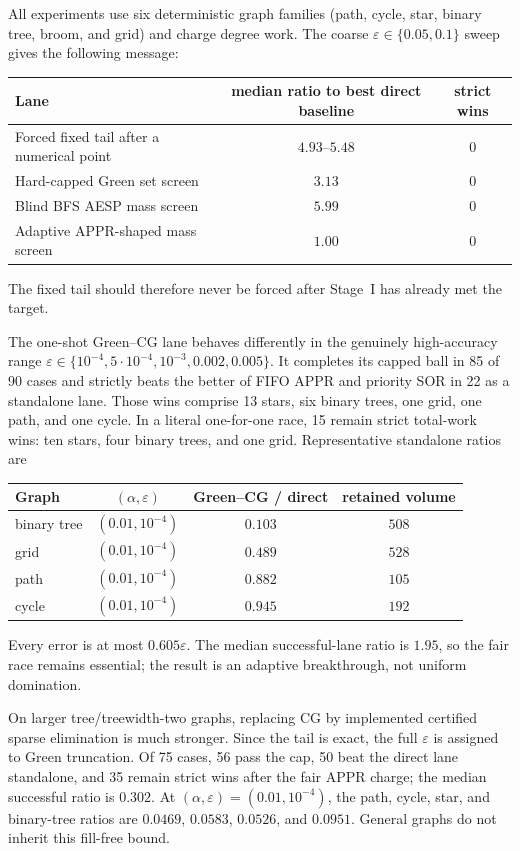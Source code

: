 All experiments use six deterministic graph families (path, cycle, star,
binary tree, broom, and grid) and charge degree work.  The coarse
$\varepsilon\in\{0.05,0.1\}$ sweep gives the following message:
\begin{center}
\small
\begin{tabular}{@{}lcc@{}}
\toprule
Lane & median ratio to best direct baseline & strict wins \\
\midrule
Forced fixed tail after a numerical point & $4.93$--$5.48$ & $0$ \\
Hard-capped Green set screen & $3.13$ & $0$ \\
Blind BFS AESP mass screen & $5.99$ & $0$ \\
Adaptive APPR-shaped mass screen & $1.00$ & $0$ \\
\bottomrule
\end{tabular}
\end{center}
The fixed tail should therefore never be forced after Stage~I has already met
the target.

The one-shot Green--CG lane behaves differently in the genuinely
high-accuracy range
$\varepsilon\in\{10^{-4},5\cdot10^{-4},10^{-3},0.002,0.005\}$.
It completes its capped ball in 85 of 90 cases and strictly beats the better
of FIFO APPR and priority SOR in 22 as a standalone lane.  Those wins comprise
13 stars, six binary trees, one grid, one path, and one cycle.  In a literal
one-for-one race, 15 remain strict total-work wins: ten stars, four binary
trees, and one grid.  Representative standalone ratios are
\begin{center}
\small
\begin{tabular}{@{}lccc@{}}
\toprule
Graph & $(\alpha,\varepsilon)$ & Green--CG / direct & retained volume \\
\midrule
binary tree & $(0.01,10^{-4})$ & $0.103$ & $508$ \\
grid & $(0.01,10^{-4})$ & $0.489$ & $528$ \\
path & $(0.01,10^{-4})$ & $0.882$ & $105$ \\
cycle & $(0.01,10^{-4})$ & $0.945$ & $192$ \\
\bottomrule
\end{tabular}
\end{center}
Every error is at most $0.605\varepsilon$.  The median successful-lane ratio
is $1.95$, so the fair race remains essential; the result is an adaptive
breakthrough, not uniform domination.

On larger tree/treewidth-two graphs, replacing CG by implemented certified
sparse elimination is much stronger.  Since the tail is exact, the full
$\varepsilon$ is assigned to Green truncation.  Of 75 cases, 56 pass the cap,
50 beat the direct lane standalone, and 35 remain strict wins after the fair
APPR charge; the median successful ratio is $0.302$.  At
$(\alpha,\varepsilon)=(0.01,10^{-4})$, the path, cycle, star, and binary-tree
ratios are $0.0469$, $0.0583$, $0.0526$, and $0.0951$.  General graphs do not
inherit this fill-free bound.

